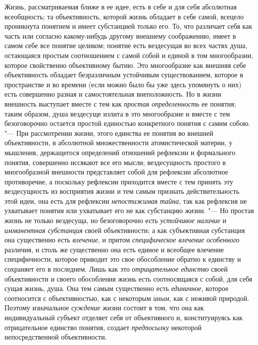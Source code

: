 Жизнь, рассматриваемая ближе в ее идее, есть в себе и для себя
абсолютная всеобщность; та объективность, которой жизнь обладает в себе
самой, всецело проникнута понятием и имеет субстанцией только его. То, что
различает себя как часть или согласно какому-нибудь другому внешнему
соображению, имеет в самом себе все понятие целиком; понятие есть
вездесущая во всех частях душа, остающаяся простым соотношением с самой
собой и единой в том многообразии, которое свойственно объективному бытию.
Это многообразие как внешняя себе объективность обладает безразличным
устойчивым существованием, которое в пространстве и во времени (если можно
было бы уже здесь упомянуть о них) есть совершенно разная и самостоятельная
внеположность. Но в жизни внешность выступает вместе с тем как
{\em простая определенность}
ее понятия; таким образом, душа вездесуще излита в это
многообразие и вместе с тем безоговорочно остается простой единостью
конкретного понятия с самим собою. "--- При рассмотрении жизни,
этого единства ее понятия во внешней объективности, в абсолютной
множественности атомистической материи, у мышления,
держащегося определений отношений рефлексии и формального понятия,
совершенно иссякают все его мысли; вездесущность простого в многообразной
внешности представляет собой для рефлексии абсолютное противоречие, а
поскольку рефлексии приходится вместе с тем принять эту вездесущность из
восприятия жизни и тем самым признать действительность этой идеи, она есть
для рефлексии {\em непостижимая тайна},
так как рефлексия не ухватывает понятия или ухватывает его не
как субстанцию жизни. "--- Но простая жизнь не только
вездесуща, но безоговорочно есть
{\em устойчивое наличие}
и {\em имманентная
субстанция} своей объективности; а как субъективная
субстанция она существенно есть
{\em влечение}, и притом
{\em специфическое влечение особенного}
различия, и столь же существенно она есть единое и всеобщее
влечение специфичности, которое приводит это свое обособление обратно к
единству и сохраняет его в последнем. Лишь как это
{\em отрицательное единство}
своей объективности и своего обособления жизнь есть
соотносящаяся с собой, для себя сущая жизнь, душа. Она тем самым
существенно есть {\em единичное},
которое соотносится с объективностью, как с некоторым {\em иным},
как с неживой природой. Поэтому изначальное
{\em суждение}
жизни состоит в том, что она как индивидуальный субъект
отделяет себя от объективного и, конституируясь как отрицательное единство
понятия, создает {\em предпосылку}
некоторой непосредственной объективности.

